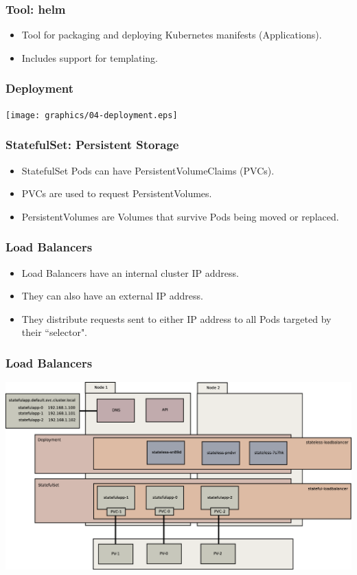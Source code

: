     \begin{frame}
        \frametitle{Tool: helm\footnotemark}
        \begin{itemize}
            \item Tool for packaging and deploying Kubernetes manifests (Applications).\pause
            \item Includes support for templating.
        \end{itemize}
    \end{frame}

    \begin{frame}
        \frametitle{Deployment}
        \texttt{[image: graphics/04-deployment.eps]}
    \end{frame}

    \begin{frame}
        \frametitle{StatefulSet: Persistent Storage}
        \begin{itemize}
            \item StatefulSet Pods can have PersistentVolumeClaims (PVCs).\pause
            \item PVCs are used to request PersistentVolumes.\pause
            \item PersistentVolumes are Volumes that survive Pods being moved or replaced.
        \end{itemize}
    \end{frame}

    \begin{frame}
        \frametitle{Load Balancers}
        \begin{itemize}
            \item Load Balancers have an internal cluster IP address.\pause
            \item They can also have an external IP address.\pause
            \item They distribute requests sent to either IP address to all Pods targeted by their ``selector".
        \end{itemize}
    \end{frame}

    \begin{frame}
        \frametitle{Load Balancers}
        \includegraphics[width=\textwidth,height=0.85\textheight,keepaspectratio]{graphics/08-loadBalancer.eps}
    \end{frame}

